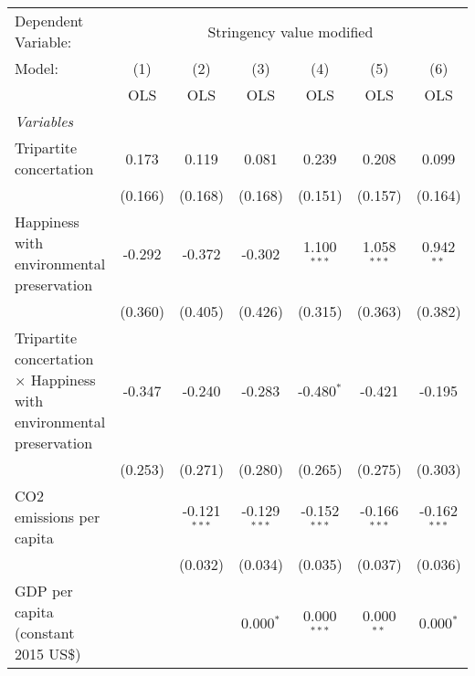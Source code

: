 
\begingroup
\centering
\begin{tabular}{lcccccc}
   \toprule
   Dependent Variable: & \multicolumn{6}{c}{Stringency value modified}\\
   Model:                                                                      & (1)     & (2)            & (3)            & (4)            & (5)            & (6)\\  
                                                                               &  OLS    & OLS            & OLS            & OLS            & OLS            & OLS\\  
   \midrule
   \emph{Variables}\\
   Tripartite concertation                                                     & 0.173   & 0.119          & 0.081          & 0.239          & 0.208          & 0.099\\   
                                                                               & (0.166) & (0.168)        & (0.168)        & (0.151)        & (0.157)        & (0.164)\\   
   Happiness with environmental preservation                                   & -0.292  & -0.372         & -0.302         & 1.100$^{***}$  & 1.058$^{***}$  & 0.942$^{**}$\\   
                                                                               & (0.360) & (0.405)        & (0.426)        & (0.315)        & (0.363)        & (0.382)\\   
   Tripartite concertation $\times$ Happiness with environmental preservation  & -0.347  & -0.240         & -0.283         & -0.480$^{*}$   & -0.421         & -0.195\\   
                                                                               & (0.253) & (0.271)        & (0.280)        & (0.265)        & (0.275)        & (0.303)\\   
   CO2 emissions per capita                                                    &         & -0.121$^{***}$ & -0.129$^{***}$ & -0.152$^{***}$ & -0.166$^{***}$ & -0.162$^{***}$\\   
                                                                               &         & (0.032)        & (0.034)        & (0.035)        & (0.037)        & (0.036)\\   
   GDP per capita (constant 2015 US\$)                                         &         &                & 0.000$^{*}$    & 0.000$^{***}$  & 0.000$^{**}$   & 0.000$^{*}$\\   

\end{tabular}
